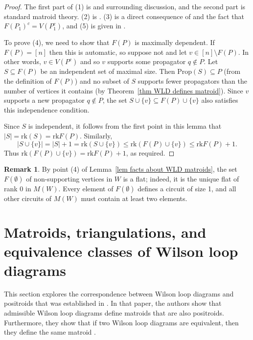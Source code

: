 \documentclass[11pt]{article}
\newcommand{\rk}{\textrm{rk} }
\newcommand{\Prop}{\textrm{Prop}}
\theoremstyle{remark}
\theoremstyle{definition}
\newtheorem{rmk}[thm]{Remark}
\begin{document}
\begin{proof}
The first part of (1) is \cite[Equation (9)]{wilsonloop} and surrounding discussion, and the second part is standard matroid theory. (2) is \cite[Lemma 3.27]{wilsonloop}. (3) is a direct consequence of \cite[Lemma 3.20]{wilsonloop} and the fact that $F(P_1)^c = V(P_1^c)$, and (5) is given in \cite[Lemma 3.28]{wilsonloop}.

To prove (4), we need to show that $F(P)$ is maximally dependent. If $F(P) = [n]$ then this is automatic, so suppose not and let $v \in [n] \setminus F(P)$. In other words, $v \in V(P^c)$ and so $v$ supports some propagator $q \not\in P$.  Let $S \subseteq F(P)$ be an independent set of maximal size. Then $\Prop(S) \subseteq P$ (from the definition of $F(P)$) and no subset of $S$ supports fewer propagators than the number of vertices it contains (by Theorem~\ref{thm WLD defines matroid}). Since $v$ supports a new propagator $q \not\in P$, the set $S \cup \{v\} \subseteq F(P) \cup \{v\}$ also satisfies this independence condition.

Since $S$ is independent, it follows from the first point in this lemma that $|S| = \rk(S) = \rk F(P)$. Similarly, 
\[|S \cup \{v\}| = |S|+1 = \rk (S \cup \{v\}) \leq \rk(F(P) \cup \{v\}) \leq \rk F(P) + 1.\]
Thus $\rk(F(P) \cup\{v\}) = \rk F(P) + 1$, as required.
\end{proof}

\begin{rmk}
By point (4) of Lemma~\ref{lem facts about WLD matroids}, the set $F(\emptyset)$ of non-supporting vertices in $W$ is a flat; indeed, it is the unique flat of rank 0 in $M(W)$. Every element of $F(\emptyset)$ defines a circuit of size 1, and all other circuits of $M(W)$ must contain at least two elements.
\end{rmk}




\section{Matroids, triangulations, and equivalence classes of Wilson loop diagrams}\label{sec equiv}

This section explores the correspondence between Wilson loop diagrams and positroids that was established in \cite[Theorem 3.38]{wilsonloop}. In that paper, the authors show that admissible Wilson loop diagrams define matroids that are also positroids. Furthermore, they show that if two Wilson loop diagrams are equivalent, then they define the same matroid \cite[Theorems 1.18 and 3.41]{wilsonloop}.
\end{document}
